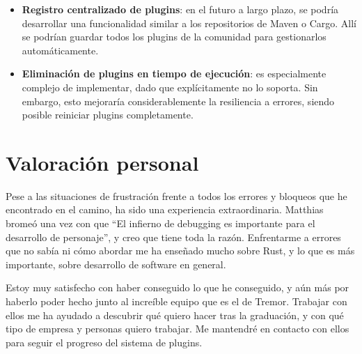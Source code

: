 \begin{itemize}
    \item \textbf{Registro centralizado de plugins}: en el futuro a largo plazo,
        se podría desarrollar una funcionalidad similar a los repositorios de
        Maven o Cargo. Allí se podrían guardar todos los plugins de la comunidad
        para gestionarlos automáticamente.

    \item \textbf{Eliminación de plugins en tiempo de ejecución}: es
        especialmente complejo de implementar, dado que \abistable
        explícitamente no lo soporta. Sin embargo, esto mejoraría
        considerablemente la resiliencia a errores, siendo posible reiniciar
        plugins completamente.

\end{itemize}

\section{Valoración personal}

Pese a las situaciones de frustración frente a todos los errores y bloqueos que
he encontrado en el camino, ha sido una experiencia extraordinaria. Matthias
bromeó una vez con que ``El infierno de debugging es importante para el
desarrollo de personaje'', y creo que tiene toda la razón. Enfrentarme a errores
que no sabía ni cómo abordar me ha enseñado mucho sobre Rust, y lo que es más
importante, sobre desarrollo de software en general.

Estoy muy satisfecho con haber conseguido lo que he conseguido, y aún más por
haberlo poder hecho junto al increíble equipo que es el de Tremor. Trabajar con
ellos me ha ayudado a descubrir qué quiero hacer tras la graduación, y con qué
tipo de empresa y personas quiero trabajar. Me mantendré en contacto con ellos
para seguir el progreso del sistema de plugins.
